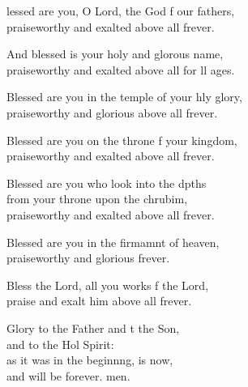 \settowidth{\versewidth}{Blessed are you in the temple of your holy glory, *}
\begin{psalmverse}%
  \begin{patverse}
lessed are you, O Lord, the God f our fathers,\Med\\
praiseworthy and exalted above all frever.

And blessed is your holy and glor\pointup{\i}ous name,\Med\\
praiseworthy and exalted above all for ll ages.

Blessed are you in the temple of your hly glory,\Med\\
praiseworthy and glorious above all frever.

Blessed are you on the throne f your kingdom,\Med\\
praiseworthy and exalted above all frever.

Blessed are you who look into the dpths\Flex\\
from your throne upon the chrubim,\Med\\
praiseworthy and exalted above all frever.

Blessed are you in the firmamnt of heaven,\Med\\
praiseworthy and glorious frever.

Bless the Lord, all you works f the Lord,\Med\\
praise and exalt him above all frever.

Glory to the Father and t the Son,\Med\\
and to the Hol Spirit:\\
as it was in the beginn\pointup{\i}ng, is now,\Med\\
and will be forever. men. 
  \end{patverse}
\end{psalmverse}
